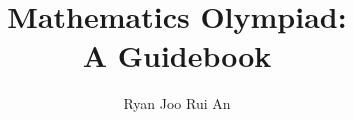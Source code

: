\begin{titlepage}
\title{\sffamily\bfseries Mathematics Olympiad:\\[1ex] A Guidebook}
\author{Ryan Joo Rui An}
\date{}
\end{titlepage}

\maketitle